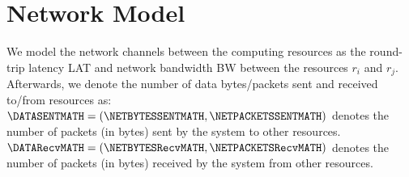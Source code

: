 




    \section{Network Model}
    \label{sec:network-model}

        We model the network channels between the computing resources as the round-trip latency LAT and network bandwidth BW between the resources $r_i$ and $r_j$.
        Afterwards, we denote the number of data bytes/packets sent and received to/from resources as: 
        $\DATASENTMATH = (\NETBYTESSENTMATH, \NETPACKETSSENTMATH)$ denotes the number of packets (in bytes) sent by the system to other resources.
        $\DATARecvMATH = (\NETBYTESRecvMATH, \NETPACKETSRecvMATH)$ denotes the number of packets (in bytes) received by the system from other resources.


